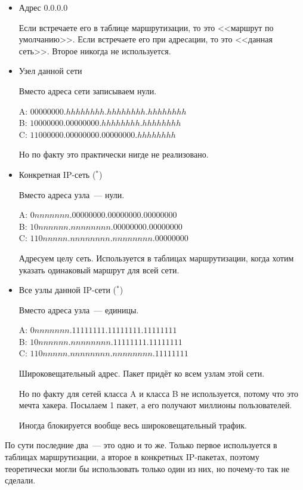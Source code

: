 \begin{itemize}
    \item Адрес $0.0.0.0$

    Если встречаете его в таблице маршрутизации, то это <<маршрут по умолчанию>>. Если встречаете его при адресации, то это <<данная сеть>>. Второе никогда не используется.
    \item Узел данной сети

    Вместо адреса сети записываем нули.

    A: $00000000.hhhhhhhh.hhhhhhhh.hhhhhhhh$\\
    B: $10000000.00000000.hhhhhhhh.hhhhhhhh$\\
    C: $11000000.00000000.00000000.hhhhhhhh$

    Но по факту это практически нигде не реализовано.

    \item Конкретная IP-сеть ($^*$)

    Вместо адреса узла~--- нули.

    A: $0nnnnnnn.00000000.00000000.00000000$\\
    B: $10nnnnnn.nnnnnnnn.00000000.00000000$\\
    C: $110nnnnn.nnnnnnnn.nnnnnnnn.00000000$

    Адресуем целу сеть. Используется в таблицах маршрутизации, когда хотим указать одинаковый маршрут для всей сети.

    \item Все узлы данной IP-сети ($^*$)

    Вместо адреса узла~--- единицы.

    A: $0nnnnnnn.11111111.11111111.11111111$\\
    B: $10nnnnnn.nnnnnnnn.11111111.11111111$\\
    C: $110nnnnn.nnnnnnnn.nnnnnnnn.11111111$

    Широковещательный адрес. Пакет придёт ко всем узлам этой сети. 

    Но по факту для сетей класса A и класса B не используется, потому что это мечта хакера. Посылаем 1 пакет, а его получают миллионы пользователей.

    Иногда блокируется вообще весь широковещательный трафик.

\end{itemize}

По сути последние два~--- это одно и то же. Только первое используется в таблицах маршрутизации, а второе в конкретных IP-пакетах, поэтому теоретически могли бы использовать только один из них, но почему-то так не сделали.

